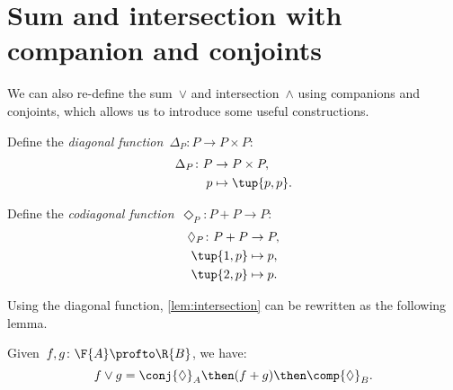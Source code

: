 \section{Sum and intersection with companion and conjoints}

We can also re-define the sum~$\vee$ and intersection~$\wedge$ using companions and conjoints, which allows us to introduce some useful constructions.

\begin{definition}
  Define the \emph{diagonal function}~$\Delta_P\colon P \to P \times P$:
  \begin{equation}
    \begin{aligned}
      \Delta_P \colon P & \to P \times P, \\
      p & \mapsto \tup{p, p}.
    \end{aligned}
  \end{equation}
\end{definition}

\begin{definition}
  Define the \emph{codiagonal function}~$\Diamond_P\colon P+P \to P $:
  \begin{equation}
    \begin{aligned}
      \Diamond_P \colon P + P & \to P,  \\
      \tup{1,p} & \mapsto p, \\
      \tup{2,p} & \mapsto p.
    \end{aligned}
  \end{equation}
\end{definition}

\noindent Using the diagonal function, \cref{lem:intersection} can be rewritten as the following lemma.

\begin{lemma}
  Given~$f, g\colon \F{A} \profto \R{B}$, we have:
  \begin{equation}
    f \vee g =  \conj{\Diamond}_A \then (f + g)\then \comp{\Diamond}_B.
  \end{equation}
\end{lemma}

